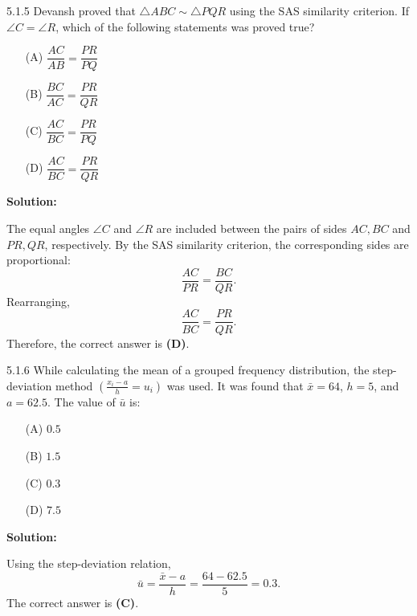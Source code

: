 \documentclass[journal]{IEEEtran}
\begin{document}
\begin{list}{}{\setlength{\leftmargin}{1.15cm}\setlength{\labelwidth}{1.0cm}\setlength{\labelsep}{0.15cm}\setlength{\itemindent}{0pt}\setlength{\listparindent}{0pt}\setlength{\parsep}{0pt}\setlength{\topsep}{0pt}}
\item[5.1.5] Devansh proved that $\triangle ABC \sim \triangle PQR$ using the SAS similarity criterion. If $\angle C = \angle R$, which of the following statements was proved true?

\begin{enumerate}
    \item[(A)] $\dfrac{AC}{AB} = \dfrac{PR}{PQ}$
    \item[(B)] $\dfrac{BC}{AC} = \dfrac{PR}{QR}$
    \item[(C)] $\dfrac{AC}{BC} = \dfrac{PR}{PQ}$
    \item[(D)] $\dfrac{AC}{BC} = \dfrac{PR}{QR}$
\end{enumerate}

\vspace{0.7em}\par\noindent\textbf{Solution:}

The equal angles $\angle C$ and $\angle R$ are included between the pairs of sides $AC, BC$ and $PR, QR$, respectively. By the SAS similarity criterion, the corresponding sides are proportional:
\[
\frac{AC}{PR} = \frac{BC}{QR}.
\]
Rearranging,
\[
\frac{AC}{BC} = \frac{PR}{QR}.
\]
Therefore, the correct answer is \textbf{(D)}.


\end{list}
\vspace{1.2em}
\begin{list}{}{\setlength{\leftmargin}{1.15cm}\setlength{\labelwidth}{1.0cm}\setlength{\labelsep}{0.15cm}\setlength{\itemindent}{0pt}\setlength{\listparindent}{0pt}\setlength{\parsep}{0pt}\setlength{\topsep}{0pt}}
\item[5.1.6] While calculating the mean of a grouped frequency distribution, the step-deviation method $\left(\frac{x_i-a}{h}=u_i\right)$ was used. It was found that $\bar{x}=64$, $h=5$, and $a=62.5$. The value of $\bar{u}$ is:

\begin{enumerate}
    \item[(A)] $0.5$
    \item[(B)] $1.5$
    \item[(C)] $0.3$
    \item[(D)] $7.5$
\end{enumerate}

\vspace{0.7em}\par\noindent\textbf{Solution:}

Using the step-deviation relation,
\[
\bar{u}=\frac{\bar{x}-a}{h}=\frac{64-62.5}{5}=0.3.
\]
The correct answer is \textbf{(C)}.

\end{list}
\end{document}
